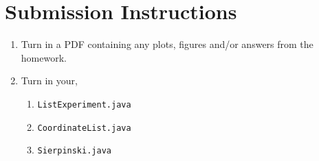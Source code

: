 \documentclass{homework}
\begin{document}
\section*{Submission Instructions}

\begin{enumerate}
    \item Turn in a PDF containing any plots, figures and/or answers from the homework.
    \item Turn in your,
    \begin{enumerate}[label=\roman*)]
        \item \texttt{ListExperiment.java}
        \item \texttt{CoordinateList.java}
        \item \texttt{Sierpinski.java}
    \end{enumerate}
\end{enumerate}
\end{document}

